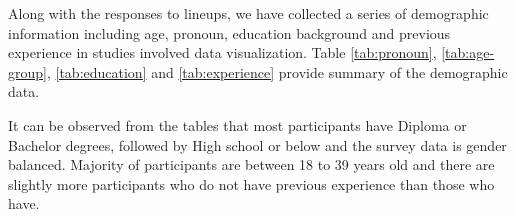 \documentclass[]{interact}
\theoremstyle{plain}%
\theoremstyle{definition}
\theoremstyle{remark}
\begin{document}
Along with the responses to lineups, we have collected a series of
demographic information including age, pronoun, education background and
previous experience in studies involved data visualization. Table
\ref{tab:pronoun}, \ref{tab:age-group}, \ref{tab:education} and
\ref{tab:experience} provide summary of the demographic data.

It can be observed from the tables that most participants have Diploma
or Bachelor degrees, followed by High school or below and the survey
data is gender balanced. Majority of participants are between 18 to 39
years old and there are slightly more participants who do not have
previous experience than those who have.

\begin{table}

\caption{\label{tab:pronoun}Summary of pronoun distribution of subjects recuritted in this study.}
\centering
{}
\end{table}

\begin{table}

\caption{\label{tab:age-group}Summary of age distribution of subjects recuritted in this study.}
\centering
{}
\end{table}
\end{document}
